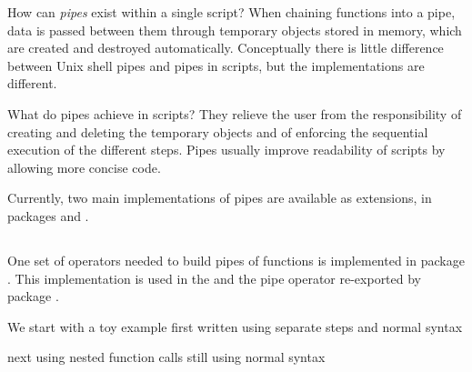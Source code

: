 \documentclass[krantz2]{krantz}\usepackage{knitr}
\begin{document}
How can \emph{pipes} exist within a single \Rlang script? When chaining functions into a pipe, data is passed between them through temporary \Rlang objects stored in memory, which are created and destroyed automatically. Conceptually there is little difference between Unix shell pipes and pipes in \Rlang scripts, but the implementations are different.

What do pipes achieve in \Rlang scripts? They relieve the user from the responsibility of creating and deleting the temporary objects and of enforcing the sequential execution of the different steps. Pipes usually improve readability of scripts by allowing more concise code.

Currently, two main implementations of pipes are available as \Rlang extensions, in packages  and .

\subsection{}
One set of operators needed to build pipes of \Rlang functions is implemented in package . This implementation is used in the  and the pipe operator re-exported by package .

We start with a toy example first written using separate steps and normal \Rlang syntax

\begin{knitrout}\footnotesize
{}\color{fgcolor}\begin{kframe}
\begin{alltt}
 \hlkwb{<-} \hlopt{:}
 \hlkwb{<-} 
 \hlkwb{<-} 
 
\end{alltt}
\end{kframe}
\end{knitrout}

next using nested function calls still using normal \Rlang syntax

\begin{knitrout}\footnotesize
{}\color{fgcolor}\begin{kframe}
\begin{alltt}
 \hlkwb{<-} \hlstd{(}
\end{alltt}
\end{kframe}
\end{knitrout}
\end{document}
